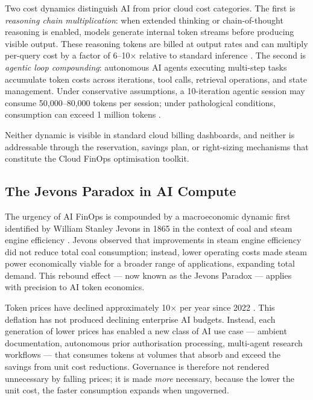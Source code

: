 \documentclass[11pt,twocolumn]{article}
\begin{document}
Two cost dynamics distinguish AI from prior cloud cost categories. The first
is \textit{reasoning chain multiplication}: when extended thinking or chain-of-thought
reasoning is enabled, models generate internal token streams before producing
visible output. These reasoning tokens are billed at output rates and can
multiply per-query cost by a factor of 6--10$\times$ relative to standard inference
\citep{anthropic2025extended}. The second is \textit{agentic loop compounding}:
autonomous AI agents executing multi-step tasks accumulate token costs across
iterations, tool calls, retrieval operations, and state management. Under
conservative assumptions, a 10-iteration agentic session may consume 50,000--80,000
tokens per session; under pathological conditions, consumption can exceed
1 million tokens \citep{introl2025}.

Neither dynamic is visible in standard cloud billing dashboards, and neither
is addressable through the reservation, savings plan, or right-sizing mechanisms
that constitute the Cloud FinOps optimisation toolkit.

\subsection{The Jevons Paradox in AI Compute}

The urgency of AI FinOps is compounded by a macroeconomic dynamic first
identified by William Stanley Jevons in 1865 in the context of coal and steam
engine efficiency \citep{jevons1865}. Jevons observed that improvements in
steam engine efficiency did not reduce total coal consumption; instead, lower
operating costs made steam power economically viable for a broader range of
applications, expanding total demand. This rebound effect --- now known as
the Jevons Paradox --- applies with precision to AI token economics.

Token prices have declined approximately 10$\times$ per year since 2022
\citep{introl2025}. This deflation has not produced declining enterprise AI
budgets. Instead, each generation of lower prices has enabled a new class of
AI use case --- ambient documentation, autonomous prior authorisation processing,
multi-agent research workflows --- that consumes tokens at volumes that absorb
and exceed the savings from unit cost reductions. Governance is therefore not
rendered unnecessary by falling prices; it is made \textit{more} necessary, because
the lower the unit cost, the faster consumption expands when ungoverned.

\end{document}
